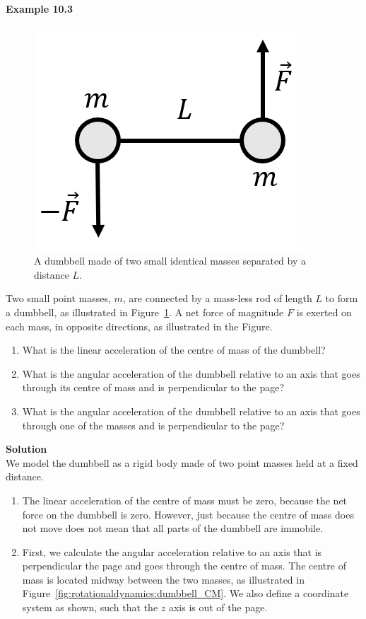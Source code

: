 \begin{framed}
\textbf{Example 10.3}\\
\begin{figure}[!htbp]
\centering
\includegraphics[width=0.375\linewidth]{files/dumbbell_2m-c253a5463337dad4c76ae7e9e9bd51c0.png}
\caption[]{A dumbbell made of two small identical masses separated by a distance $L$.}
\label{fig:rotationaldynamics:dumbbell_2m}
\end{figure}

Two small point masses, $m$, are connected by a mass-less rod of length $L$ to form a dumbbell, as illustrated in Figure~\ref{fig:rotationaldynamics:dumbbell_2m}.
A net force of magnitude $F$ is exerted on each mass, in opposite directions, as illustrated in the Figure.

\begin{enumerate}
\item What is the linear acceleration of the centre of mass of the dumbbell?
\item What is the angular acceleration of the dumbbell relative to an axis that goes through its centre of mass and is perpendicular to the page?
\item What is the angular acceleration of the dumbbell relative to an axis that goes through one of the masses and is perpendicular to the page?
\end{enumerate}

\begin{framed}
\textbf{Solution}\\
We model the dumbbell as a rigid body made of two point masses held at a fixed distance.

\begin{enumerate}
\item The linear acceleration of the centre of mass must be zero, because the net force on the dumbbell is zero. However, just because the centre of mass does not move does not mean that all parts of the dumbbell are immobile.
\item First, we calculate the angular acceleration relative to an axis that is perpendicular the page and goes through the centre of mass. The centre of mass is located midway between the two masses, as illustrated in Figure~\ref{fig:rotationaldynamics:dumbbell_CM}. We also define a coordinate system as shown, such that the $z$ axis is out of the page.
\end{enumerate}


\end{framed}
\end{framed}

